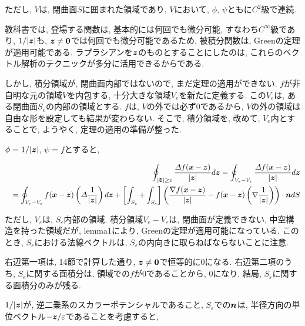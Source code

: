 \documentclass{jsarticle} \usepackage[dvipdfmx]{graphicx} \usepackage[dvipdfmx]{hyperref}
\newcommand*{\mbold}[1]{\mbox{\boldmath $#1$}}
\newcommand*{\laplacian}{\varDelta}
\begin{document}
ただし, $V$は, 閉曲面$S$に囲まれた領域であり, $V$において, $\phi$, $\psi$ともに$C^2$級で連続. 

教科書では, 登場する関数は, 基本的には何回でも微分可能, すなわち$C^\infty$級であり, $1/|\mbold{z}|$も,
$\mbold{z} \neq \mbold{0}$では何回でも微分可能であるため, 被積分関数は, Greenの定理が適用可能である. 
ラプラシアンを$\mbold{z}$のものとすることにしたのは, これらのベクトル解析のテクニックが多分に活用できるからである. 

しかし, 積分領域が, 閉曲面内部ではないので, まだ定理の適用ができない. 
$f$が非自明な元の領域$V$を内包する, 十分大きな領域$V_e$を新たに定義する. 
この$V_e$は, ある閉曲面$S_e$の内部の領域とする. 
$f$は, $V$の外では必ず$0$であるから, $V$の外の領域は自由な形を設定しても結果が変わらない. 
そこで, 積分領域を, 改めて, $V_e$内とすることで, ようやく, 定理の適用の準備が整った. 

$\phi = 1/|\mbold{z}|$, $\psi = f$とすると, 

\begin{eqnarray}
  && \oint_{|\mbold{z}| \geq \varepsilon} \frac{\varDelta f(\mbold{x} - \mbold{z})}{|\mbold{z}|}d\mbold{z}
  =
  \oint_{V_e - V_\varepsilon}\frac{\varDelta f(\mbold{x} - \mbold{z})}{|\mbold{z}|}d\mbold{z} \nonumber \\
  && =
  \oint_{V_e - V_\varepsilon} f(\mbold{x} - \mbold{z})\left( \laplacian \frac{1}{|\mbold{z}|} \right) d\mbold{z}
  +
  \left[ \int_{S_e} + \int_{S_\varepsilon} \right] \left( \frac{\nabla f(\mbold{x} - \mbold{z})}{|\mbold{z}|} - f(\mbold{x} - \mbold{z})\left( \nabla \frac{1}{|\mbold{z}|} \right) \right) \cdot \mbold{n} dS
\end{eqnarray}

ただし, $V_\varepsilon$は, $S_\varepsilon$内部の領域. 
積分領域$V_e - V_\varepsilon$は, 閉曲面が定義できない, 中空構造を持った領域だが, lemma1により, Greenの定理が適用可能になっている. 
このとき, $S_\varepsilon$における法線ベクトルは, $S_\varepsilon$の内向きに取らねばならないことに注意. 

右辺第一項は, 14節で計算した通り, $\mbold{z} \neq \mbold{0}$で恒等的に$0$になる. 
右辺第二項のうち, $S_e$に関する面積分は, 領域での$f$が$0$であることから, $0$になり, 
結局, $S_\varepsilon$に関する面積分のみが残る. 

$1/|\mbold{z}|$が, 逆二乗系のスカラーポテンシャルであること, $S_\varepsilon$での$\mbold{n}$は, 半径方向の単位ベクトル$-\mbold{z}/\varepsilon$であることを考慮すると, 
\end{document}
